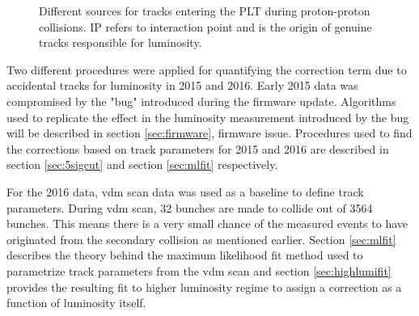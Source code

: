 \begin{figure}[htbp!]
\centering
            \captionsetup{format=hang}
    \caption{Different sources for tracks entering the PLT during proton-proton collisions. IP refers to interaction point and is the origin of genuine tracks responsible for luminosity.}
    \label{fig:collcat}
\end{figure}

Two different procedures were applied for quantifying the correction term due to accidental tracks for luminosity in 2015 and 2016. Early 2015 data was compromised by the "bug" introduced during the firmware update. Algorithms used to replicate the effect in the luminosity measurement introduced by the bug will be described in section \ref{sec:firmware}, firmware issue. Procedures used to find the corrections based on track parameters for 2015 and 2016 are described in section  \ref{sec:5sigcut} and section \ref{sec:mlfit} respectively.



For the 2016 data, vdm scan data was used as a baseline to define track parameters. During vdm scan, 32 bunches are made to collide out of 3564 bunches. This means there is a very small chance of the measured events to have originated from the secondary collision as mentioned earlier. Section \ref{sec:mlfit} describes the theory behind the maximum likelihood fit method used to parametrize track parameters from the vdm scan and section \ref{sec:highlumifit} provides the resulting fit to higher luminosity regime to assign a correction as a function of luminosity itself.

